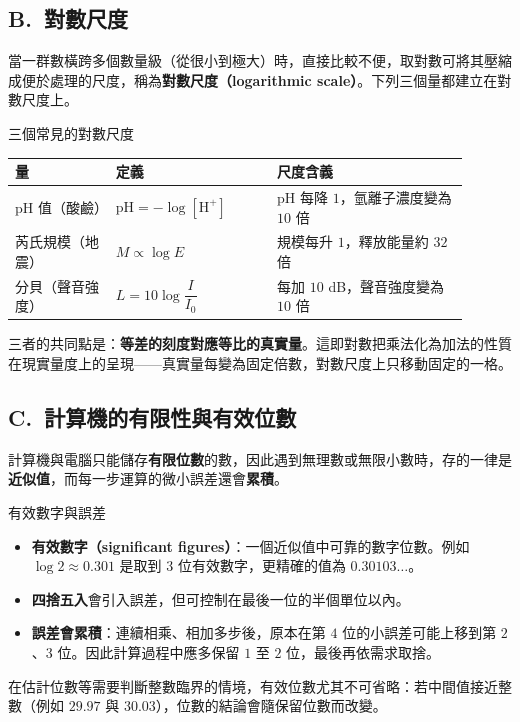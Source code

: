 \documentclass[11pt]{article}
\begin{document}
\subsection*{\sffamily B.\ 對數尺度}

當一群數橫跨多個數量級（從很小到極大）時，直接比較不便，取對數可將其壓縮成便於處理的尺度，稱為\textbf{對數尺度（logarithmic scale）}。下列三個量都建立在對數尺度上。

\begin{補充框}{三個常見的對數尺度}
\begin{center}
\renewcommand{\arraystretch}{1.4}
\begin{tabular}{p{0.20\linewidth} p{0.32\linewidth} p{0.38\linewidth}}
\hline
\textbf{量} & \textbf{定義} & \textbf{尺度含義} \\
\hline
pH 值（酸鹼） & $\text{pH}=-\log[\text{H}^+]$ & pH 每降 $1$，氫離子濃度變為 $10$ 倍 \\
芮氏規模（地震） & $M\propto\log E$ & 規模每升 $1$，釋放能量約 $32$ 倍 \\
分貝（聲音強度） & $L=10\log\dfrac{I}{I_0}$ & 每加 $10$ dB，聲音強度變為 $10$ 倍 \\
\hline
\end{tabular}
\end{center}
三者的共同點是：\textbf{等差的刻度對應等比的真實量}。這即對數把乘法化為加法的性質在現實量度上的呈現——真實量每變為固定倍數，對數尺度上只移動固定的一格。
\end{補充框}

\subsection*{\sffamily C.\ 計算機的有限性與有效位數}

計算機與電腦只能儲存\textbf{有限位數}的數，因此遇到無理數或無限小數時，存的一律是\textbf{近似值}，而每一步運算的微小誤差還會\textbf{累積}。

\begin{補充框}{有效數字與誤差}
\begin{itemize}\setlength{\itemsep}{1pt}
\item \textbf{有效數字（significant figures）}：一個近似值中可靠的數字位數。例如 $\log2\approx0.301$ 是取到 $3$ 位有效數字，更精確的值為 $0.30103\ldots$。
\item \textbf{四捨五入}會引入誤差，但可控制在最後一位的半個單位以內。
\item \textbf{誤差會累積}：連續相乘、相加多步後，原本在第 $4$ 位的小誤差可能上移到第 $2$、$3$ 位。因此計算過程中應多保留 $1$ 至 $2$ 位，最後再依需求取捨。
\end{itemize}
在估計位數等需要判斷整數臨界的情境，有效位數尤其不可省略：若中間值接近整數（例如 $29.97$ 與 $30.03$），位數的結論會隨保留位數而改變。
\end{補充框}
\end{document}
